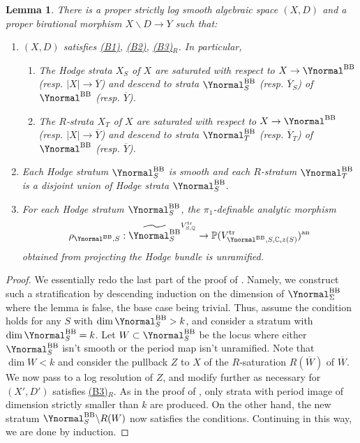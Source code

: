 \documentclass{amsart}
\newcommand{\customref}[2]{\hyperref[#1]{#2}}
\newcommand{\bs}{\backslash}
\newcommand{\an}{\operatorname{an}}
\newcommand{\ol}{\overline}
\newtheorem{lemma}[theorem]{Lemma}
\theoremstyle{definition}
\theoremstyle{remark}
\def\bQ{\mathbb{Q}}
\def\bC{\mathbb{C}}
\def\bP{\mathbb{P}}
\def\an{\mathrm{an}}
\def\trans{\mathrm{tr}}
\def\BB{\mathrm{BB}}
\renewcommand{\bar}[1]{\ol{#1}}
\numberwithin{equation}{section}
\begin{document}
\begin{lemma}\label{lem:refine1}
There is a proper strictly log smooth algebraic space $(X,D)$ and a proper birational morphism $X\bs D\to Y$ such that:
\begin{enumerate}
\item $(X,D)$ satisfies \customref{b1}{(B1)}, \customref{b2}{(B2)}, \customref{b3}{(B3)$_R$}.  In particular, 
\begin{enumerate}
\item The Hodge strata $X_S$ of $X$ are saturated with respect to $X\to \Ynormal^\BB$ (resp. $|X|\to \bar Y$) and descend to strata $\Ynormal^{\BB}_S$ (resp. $\bar Y_S$) of $\Ynormal^{\BB}$ (resp. $\bar Y$).
\item The $R$-strata $X_T$ of $X$ are saturated with respect to $X\to \Ynormal^\BB$ (resp. $|X|\to \bar Y$) and descend to strata $\Ynormal^{\BB}_T$ (resp. $\bar Y_T$) of $\Ynormal^{\BB}$ (resp. $\bar Y$).
\end{enumerate}
\item Each Hodge stratum $\Ynormal^\BB_S$ is smooth and each $R$-stratum $\Ynormal^\BB_T$ is a disjoint union of Hodge strata $\Ynormal^\BB_S$.
\item For each Hodge stratum $\Ynormal^\BB_S$, the $\pi_1$-definable analytic morphism $$\rho_{\Ynormal^\BB,S}:\widetilde{\Ynormal_S^\BB}^{V^\trans_{S,\bQ}}\to \bP(V^\trans_{\Ynormal^\BB,S,\bC,z(S)})^\an$$ obtained from projecting the Hodge bundle is unramified.
\end{enumerate}
\end{lemma}

\begin{proof}
We essentially redo the last part of the proof of . Namely, we construct such a stratification by descending induction on the dimension of $\Ynormal^\BB_\Sigma$ where the lemma is false, the base case being trivial.  Thus, assume the condition holds for any $S$ with $\dim \Ynormal^{\BB}_S>k$, and consider a stratum with $\dim \Ynormal^{\BB}_S=k$. Let $W\subset \Ynormal^{\BB}_S$ be the locus where either $\Ynormal^{\BB}_S$ isn't smooth or the period map isn't unramified. Note that $\dim W <k$ and consider the pullback $Z$ to $X$ of the $R$-saturation $R(\ol{W})$ of $\ol{W}$. We now pass to a log resolution of $Z$, and modify further as necessary for $(X',D')$ satisfies \customref{b3}{(B3)$_R$}. As in the proof of , only strata with period image of dimension strictly smaller than $k$ are produced. On the other hand, the new stratum $\Ynormal^{\BB}_S\bs R(W)$ now satisfies the conditions.  Continuing in this way, we are done by induction.
\end{proof}
\end{document}
